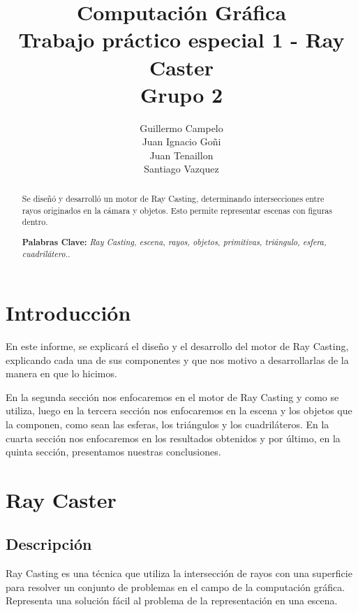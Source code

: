 \documentclass[a4paper,10pt]{article}
\begin{document}
\title{{Computaci\'on Gr\'afica \\ Trabajo pr\'actico especial 1 - Ray Caster\\ Grupo 2}}
\author{Guillermo Campelo\\Juan Ignacio Go\~ni\\Juan Tenaillon\\Santiago Vazquez}
\date{}


\maketitle

\begin{abstract}

Se dise\~n\'o y desarroll\'o un motor de Ray Casting, determinando intersecciones entre rayos originados en la c\'amara y objetos.
Esto permite representar escenas con figuras dentro.

\textbf{Palabras Clave: }\emph{Ray Casting, escena, rayos, objetos, primitivas, tri\'angulo, esfera, cuadril\'atero.}.
\end{abstract}


\section{Introducci\'on}
\label{introduccion}

En este informe, se explicar\'a el dise\~no y el desarrollo del motor de Ray Casting, explicando cada una de sus componentes y que nos motivo a desarrollarlas de la manera en que lo hicimos.

En la segunda secci\'on nos enfocaremos en el motor de Ray Casting y como se utiliza, luego en la tercera secci\'on nos enfocaremos en la escena y los objetos que la componen, como sean las esferas, 
los tri\'angulos y los cuadril\'ateros.  En la cuarta secci\'on nos enfocaremos en los resultados obtenidos y por \'ultimo, en la quinta secci\'on, presentamos nuestras conclusiones.
\section{Ray Caster}
\label{raycaster}

\subsection{Descripci\'on}
\label{subseccion}
Ray Casting es una t\'ecnica que utiliza la intersecci\'on de rayos con una superficie para resolver un conjunto de problemas en el campo de la computaci\'on gr\'afica.  Representa una soluci\'on f\'acil al problema de la representaci\'on en una escena.
\end{document}
